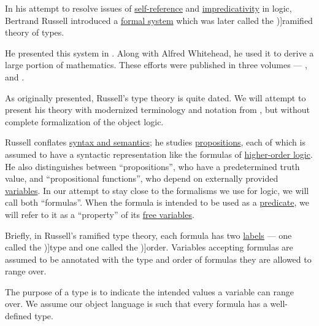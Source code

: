 \begin{concept}\label{con:ramified_type_theory}
  In his attempt to resolve issues of \hyperref[rem:self_reference]{self-reference} and \hyperref[con:impredicativity]{impredicativity} in logic, Bertrand Russell introduced a \hyperref[con:logical_system]{formal system} which was later called the \term[en=ramified theory of types (\cite[44]{Kleene1971Metamathematics})]{ramified theory of types}.

  He presented this system in \cite{Russell1908TypeTheory}. Along with Alfred Whitehead, he used it to derive a large portion of mathematics. These efforts were published in three volumes --- \cite{WhiteheadRussell1927PrincipiaMathematicaVol1}, \cite{WhiteheadRussell1927PrincipiaMathematicaVol2} and \cite{WhiteheadRussell1927PrincipiaMathematicaVol3}.

  As originally presented, Russell's type theory is quite dated. We will attempt to present his theory with modernized terminology and notation from , but without complete formalization of the object logic.

  Russell conflates \hyperref[con:syntax_semantics_duality]{syntax and semantics}; he studies \hyperref[con:proposition]{propositions}, each of which is assumed to have a syntactic representation like the formulas of \hyperref[con:higher_order_logic]{higher-order logic}. He also distinguishes between \enquote{propositions}, who have a predetermined truth value, and \enquote{propositional functions}, who depend on externally provided \hyperref[con:variable]{variables}. In our attempt to stay close to the formalisms we use for logic, we will call both \enquote{formulas}. When the formula is intended to be used as a \hyperref[def:boolean_function]{predicate}, we will refer to it as a \enquote{property} of its \hyperref[con:variable_binding]{free variables}.

  Briefly, in Russell's ramified type theory, each formula has two \hyperref[def:labeled_set]{labels} --- one called the \term[en=type (\cite[237]{Russell1908TypeTheory})]{type} and one called the \term[en=order (\cite[44]{Kleene1971Metamathematics})]{order}. Variables accepting formulas are assumed to be annotated with the type and order of formulas they are allowed to range over.

  \begin{thmenum}
     The purpose of a type is to indicate the intended values a variable can range over. We assume our object language is such that every formula has a well-defined type.


\end{thmenum}
\end{concept}
